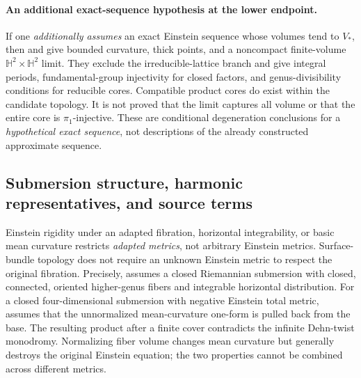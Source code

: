 \documentclass[a4paper,11pt]{article}
\numberwithin{equation}{section}
\theoremstyle{definition}
\begin{document}
\paragraph{An additional exact-sequence hypothesis at the lower endpoint.}\label{par:bundle-endpoint-scope}
If one \emph{additionally assumes} an exact Einstein sequence whose volumes tend to $V_*$, then  and  give bounded curvature, thick points, and a noncompact finite-volume $\mathbb H^2\times\mathbb H^2$ limit.
They exclude the irreducible-lattice branch and give integral periods, fundamental-group injectivity for closed factors, and genus-divisibility conditions for reducible cores.
Compatible product cores do exist within the candidate topology. It is not proved that the limit captures all volume or that the entire core is $\pi_1$-injective.
These are conditional degeneration conclusions for a \emph{hypothetical exact sequence}, not descriptions of the already constructed approximate sequence.

\subsection{Submersion structure, harmonic representatives, and source terms}\label{sec:bundle-structure-bridge}

Einstein rigidity under an adapted fibration, horizontal integrability, or basic mean curvature restricts \emph{adapted metrics}, not arbitrary Einstein metrics. Surface-bundle topology does not require an unknown Einstein metric to respect the original fibration.
Precisely,  assumes a closed Riemannian submersion with closed, connected, oriented higher-genus fibers and integrable horizontal distribution.
For a closed four-dimensional submersion with negative Einstein total metric,  assumes that the unnormalized mean-curvature one-form is pulled back from the base.
The resulting product after a finite cover contradicts the infinite Dehn-twist monodromy.
Normalizing fiber volume changes mean curvature but generally destroys the original Einstein equation; the two properties cannot be combined across different metrics.
\end{document}
